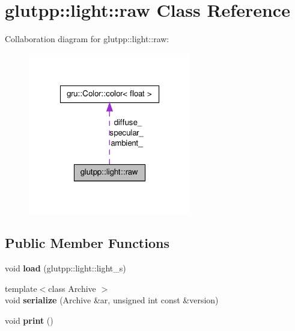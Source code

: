 \hypertarget{classglutpp_1_1light_1_1raw}{\section{glutpp\-:\-:light\-:\-:raw \-Class \-Reference}
\label{classglutpp_1_1light_1_1raw}
}


\-Collaboration diagram for glutpp\-:\-:light\-:\-:raw\-:\nopagebreak
\begin{figure}[H]
\begin{center}
\leavevmode
\includegraphics[width=202pt]{classglutpp_1_1light_1_1raw__coll__graph}
\end{center}
\end{figure}
\subsection*{\-Public \-Member \-Functions}
\begin{DoxyCompactItemize}
\item 
\hypertarget{classglutpp_1_1light_1_1raw_a6162f0f546b1b04b07757456dd5649b0}{void {\bfseries load} (glutpp\-::light\-::light\-\_\-s)}\label{classglutpp_1_1light_1_1raw_a6162f0f546b1b04b07757456dd5649b0}

\item 
\hypertarget{classglutpp_1_1light_1_1raw_afc814b37f0c86ce19d5c7f468bcf4cd1}{{\footnotesize template$<$class Archive $>$ }\\void {\bfseries serialize} (\-Archive \&ar, unsigned int const \&version)}\label{classglutpp_1_1light_1_1raw_afc814b37f0c86ce19d5c7f468bcf4cd1}

\item 
\hypertarget{classglutpp_1_1light_1_1raw_a9818fe2fc9498110fa26b408a15df2e7}{void {\bfseries print} ()}\label{classglutpp_1_1light_1_1raw_a9818fe2fc9498110fa26b408a15df2e7}

\end{DoxyCompactItemize}
